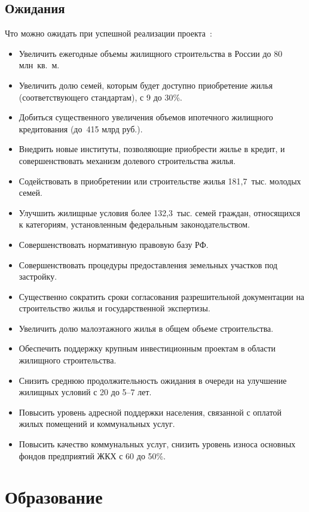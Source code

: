\documentclass[article, 12pt, russian, oneside]{ncc}
\begin{document}
\subsection{Ожидания}

Что можно ожидать при успешной реализации проекта~\cite{Hub_Waitings}:

\begin{itemize}
\item Увеличить ежегодные объемы жилищного строительства в России до
  80 млн~кв.~м.
\item Увеличить долю семей, которым будет доступно приобретение жилья
  (соответствующего стандартам), с 9 до 30\%.
\item Добиться существенного увеличения объемов ипотечного жилищного
  кредитования (до~415 млрд руб.).
\item Внедрить новые институты, позволяющие приобрести жилье в кредит,
  и совершенствовать механизм долевого строительства жилья.
\item Содействовать в приобретении или строительстве жилья
  181,7~тыс. молодых семей.
\item Улучшить жилищные условия более 132,3~тыс. семей граждан,
  относящихся к категориям, установленным федеральным
  законодательством.
\item Совершенствовать нормативную правовую базу РФ.
\item Совершенствовать процедуры предоставления земельных участков под
  застройку.
\item Существенно сократить сроки согласования разрешительной
  документации на строительство жилья и государственной экспертизы.
\item Увеличить долю малоэтажного жилья в общем объеме строительства.
\item Обеспечить поддержку крупным инвестиционным проектам в области
  жилищного строительства.
\item Снизить среднюю продолжительность ожидания в очереди на
  улучшение жилищных условий с 20 до 5--7 лет.
\item Повысить уровень адресной поддержки населения, связанной с
  оплатой жилых помещений и коммунальных услуг.
\item Повысить качество коммунальных услуг, снизить уровень износа
  основных фондов предприятий ЖКХ с 60 до 50\%.
\end{itemize}
\newpage

\section{Образование}
\end{document}
